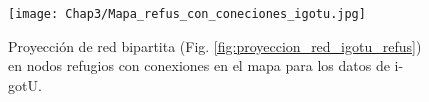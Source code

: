 \begin{figure}[ht]
    \begin{center}
        \texttt{[image: Chap3/Mapa\_refus\_con\_coneciones\_igotu.jpg]}
        \caption[Proyección en nodos refugios con conexiones en el mapa.]{Proyección de red bipartita (Fig. \ref{fig:proyeccion_red_igotu_refus}) en nodos refugios con conexiones en el mapa para los datos de i-gotU. }
        \label{fig:mapa_con_conexiones_igotu}
       
        \end{center}
\end{figure}
 
 
 
 
 
 

